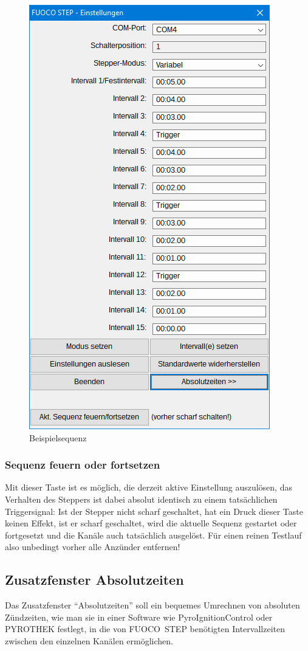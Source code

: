 \documentclass[paper=a4, open=any, numbers=noenddot]{scrbook}
\begin{document}
					\begin{figure}[tb]
						\centering\includegraphics[width=.5\textwidth]{Bilder/beispielshow}
						\caption{Beispielsequenz}
						\label{fig:beispielsequenz}
					\end{figure}

				\subsubsection*{Sequenz feuern oder fortsetzen}

					Mit dieser Taste ist es möglich, die derzeit aktive Einstellung auszulösen, das Verhalten des Steppers ist dabei absolut identisch zu einem tatsächlichen Triggersignal: Ist der Stepper nicht scharf geschaltet, hat ein Druck dieser Taste keinen Effekt, ist er scharf geschaltet, wird die aktuelle Sequenz gestartet oder fortgesetzt und die Kanäle auch tatsächlich ausgelöst. Für einen reinen Testlauf also unbedingt vorher alle Anzünder entfernen!

			\subsection{Zusatzfenster Absolutzeiten}
				\label{sec:absolutzeiten}
				Das Zusatzfenster \enquote{Absolutzeiten} soll ein bequemes Umrechnen von absoluten Zündzeiten, wie man sie in einer Software wie PyroIgnitionControl oder PYROTHEK festlegt, in die von FUOCO~STEP benötigten Intervallzeiten zwischen den einzelnen Kanälen ermöglichen.
\end{document}
